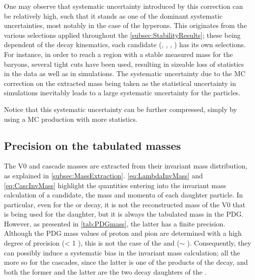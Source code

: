 One may observe that systematic uncertainty introduced by this correction can be relatively high, such that it stands as one of the dominant systematic uncertainties, most notably in the case of the \rmXi hyperons. This originates from the various selections applied throughout the \Sec\ref{subsec:StabilityResults}; these being dependent of the decay kinematics, each candidate (\rmKzeroS, \rmLambda, \rmXi, \rmOmega) has its own selections. For instance, in order to reach a region with a stable measured mass for the \rmXi baryons, several tight cuts have been used, resulting in sizeable loss of statistics in the data as well as in simulations. The systematic uncertainty due to the MC correction on the extracted mass being taken as the statistical uncertainty in simulations inevitably leads to a large systematic uncertainty for the \rmXi particles. 

Notice that this systematic uncertainty can be further compressed, simply by using a MC production with more statistics.

\subsection{Precision on the tabulated masses}

The V0 and cascade masses are extracted from their invariant mass distribution, as explained in \Sec\ref{subsec:MassExtraction}. \Eq\ref{eq:LambdaInvMass} and \ref{eq:CascInvMass} highlight the quantities entering into the invariant mass calculation of a candidate, \ie the mass and momenta of each daughter particle. In particular, even for the \rmXiPM or \rmOmegaPM decay, it is not the reconstructed mass of the V0 that is being used for the \rmLambdaPM daughter, but it is always the tabulated mass in the PDG. However, as presented in \tab\ref{tab:PDGmass}, the latter has a finite precision. Although the PDG mass values of proton and pion are determined with a high degree of precision (\sigmaPDG < 1 \kmass), this is not the case of the \rmKPM and \rmLambdaPM (\sigmaPDG $\sim$ \kmass). Consequently, they can possibly induce a systematic bias in the invariant mass calculation; all the more so for the cascades, since the latter is one of the products of the \rmXi decay, and both the former and the latter are the two decay daughters of the \rmOmega. 

